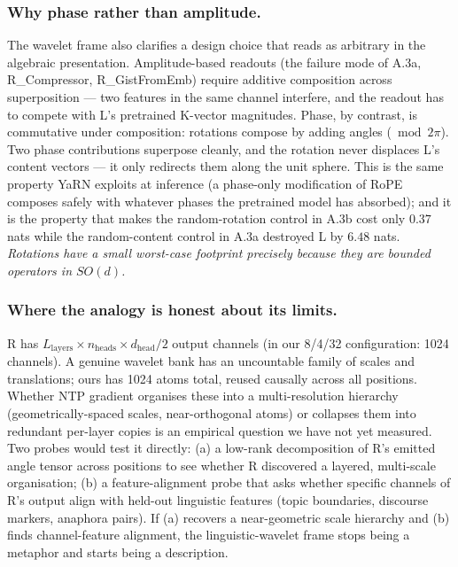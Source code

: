 \documentclass[10pt, twocolumn, a4paper]{article}
\begin{document}
\subsubsection*{Why phase rather than amplitude.} The wavelet frame also clarifies a design choice that reads as arbitrary in the algebraic presentation. Amplitude-based readouts (the failure mode of A.3a, R\_Compressor, R\_GistFromEmb) require additive composition across superposition --- two features in the same channel interfere, and the readout has to compete with L's pretrained K-vector magnitudes. Phase, by contrast, is commutative under composition: rotations compose by adding angles ($\bmod 2\pi$). Two phase contributions superpose cleanly, and the rotation never displaces L's content vectors --- it only redirects them along the unit sphere. This is the same property YaRN exploits at inference (a phase-only modification of RoPE composes safely with whatever phases the pretrained model has absorbed); and it is the property that makes the random-rotation control in A.3b cost only $0.37$ nats while the random-content control in A.3a destroyed L by $6.48$ nats. \emph{Rotations have a small worst-case footprint precisely because they are bounded operators in $SO(d)$.}

\subsubsection*{Where the analogy is honest about its limits.} R has $L_{\text{layers}} \times n_{\text{heads}} \times d_{\text{head}}/2$ output channels (in our 8/4/32 configuration: 1024 channels). A genuine wavelet bank has an uncountable family of scales and translations; ours has 1024 atoms total, reused causally across all positions. Whether NTP gradient organises these into a multi-resolution hierarchy (geometrically-spaced scales, near-orthogonal atoms) or collapses them into redundant per-layer copies is an empirical question we have not yet measured. Two probes would test it directly: (a) a low-rank decomposition of R's emitted angle tensor across positions to see whether R discovered a layered, multi-scale organisation; (b) a feature-alignment probe that asks whether specific channels of R's output align with held-out linguistic features (topic boundaries, discourse markers, anaphora pairs). If (a) recovers a near-geometric scale hierarchy and (b) finds channel-feature alignment, the linguistic-wavelet frame stops being a metaphor and starts being a description.
\end{document}
